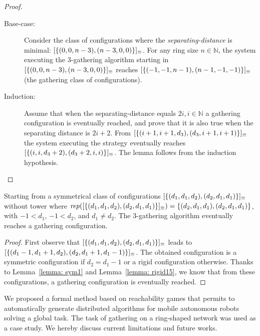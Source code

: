 	\begin{proof}\hfill	%
	\begin{description}%
		\item [Base-case:  ] 
			Consider the class of configurations where the \emph{separating-distance} is minimal:  $[\{(0, 0, n-3),(n-3,0,0)\}]_{\equiv}$. 
			For any ring size $n \in \mathbb{N}$, the system executing the 3-gathering algorithm starting in 
			$[\{(0, 0, n-3),(n-3,0,0)\}]_{\equiv}$ reaches 
			$[\{(-1, -1, n-1),(n-1,-1,-1)\}]_{\equiv}$ (the gathering class of configurations). 
		 \item [Induction:  ] 
			Assume that when the separating-distance equals $2i, i \in \mathbb{N}$ a gathering configuration is eventually
			reached, and prove that it is also true when the separating distance is $2i+2$.
			From $[\{(i+1, i+1, d_3),(d_3,i+1,i+1)\}]_{\equiv}$ the system executing the strategy %
			eventually reaches $[\{(i, i, d_3+2),(d_3+2,i,i)\}]_{\equiv}$.
	 		The lemma follows from the induction hypothesis. 
	\end{description}
	\end{proof}
	
\begin{lemma}
\label{lemma: sym2}
Starting from a symmetrical class of configurations $[\{(d_1, d_1, d_2),(d_2,d_1,d_1)\}]_{\equiv}$ without tower where 
$\mathit{rep}([\{(d_1, d_1, d_2),(d_2,d_1,d_1)\}]_{\equiv}) =  \{(d_2, d_1, d_1),(d_2,d_1,d_1)\}$, with $-1 < d_1$, $-1 < d_2$, and $d_1 \neq d_2$.
The 3-gathering algorithm eventually reaches a gathering configuration.
\end{lemma}
	
	\begin{proof}
	First observe that $[\{(d_1, d_1, d_2),(d_2,d_1,d_1)\}]_{\equiv}$ leads to $[\{(d_1-1, d_1+1, d_2),(d_2,d_1+1,d_1-1)\}]_{\equiv}$.
	The obtained configuration is a symmetric configuration if $d_2=d_1-1$
	or a rigid configuration otherwise. Thanks to Lemma~\ref{lemma: sym1} and Lemma~\ref{lemma: rigid15}, we know that from these configurations, a gathering configuration is eventually reached.
	\end{proof}  



We proposed a formal method based on reachability games that permits to automatically generate distributed algorithms for mobile autonomous robots solving a global task. The task of gathering on a ring-shaped network was used as a case study. We hereby discuss current limitations and future works.


